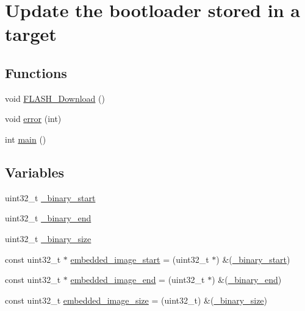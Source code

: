 \hypertarget{group___bootloader_update}{\section{\-Update the bootloader stored in a target}
\label{group___bootloader_update}
}
\subsection*{\-Functions}
\begin{DoxyCompactItemize}
\item 
void \hyperlink{group___bootloader_update_ga7ec2ca9d0a908d6508dbc58c00eb18ec}{\-F\-L\-A\-S\-H\-\_\-\-Download} ()
\item 
void \hyperlink{group___bootloader_update_ga5879845a39e040157796c1d907f43d24}{error} (int)
\item 
int \hyperlink{group___bootloader_update_gae66f6b31b5ad750f1fe042a706a4e3d4}{main} ()
\end{DoxyCompactItemize}
\subsection*{\-Variables}
\begin{DoxyCompactItemize}
\item 
uint32\-\_\-t \hyperlink{group___bootloader_update_ga18e22c4c1de6a3912b0e36471b4c97af}{\-\_\-binary\-\_\-start}
\item 
uint32\-\_\-t \hyperlink{group___bootloader_update_gaa9ad8016b46b914281992b372d57a1fd}{\-\_\-binary\-\_\-end}
\item 
uint32\-\_\-t \hyperlink{group___bootloader_update_ga65b6d3b8a474ae5ea96d13fd17ec8e2f}{\-\_\-binary\-\_\-size}
\item 
const uint32\-\_\-t $\ast$ \hyperlink{group___bootloader_update_ga3afaa362525714c794fa80cf079ff93f}{embedded\-\_\-image\-\_\-start} = (uint32\-\_\-t $\ast$) \&(\hyperlink{group___bootloader_update_ga18e22c4c1de6a3912b0e36471b4c97af}{\-\_\-binary\-\_\-start})
\item 
const uint32\-\_\-t $\ast$ \hyperlink{group___bootloader_update_ga8b1e4a9a16473320612d8461c4d887b9}{embedded\-\_\-image\-\_\-end} = (uint32\-\_\-t $\ast$) \&(\hyperlink{group___bootloader_update_gaa9ad8016b46b914281992b372d57a1fd}{\-\_\-binary\-\_\-end})
\item 
const uint32\-\_\-t \hyperlink{group___bootloader_update_ga9735096d394222154ea06b9b81667254}{embedded\-\_\-image\-\_\-size} = (uint32\-\_\-t) \&(\hyperlink{group___bootloader_update_ga65b6d3b8a474ae5ea96d13fd17ec8e2f}{\-\_\-binary\-\_\-size})
\end{DoxyCompactItemize}


